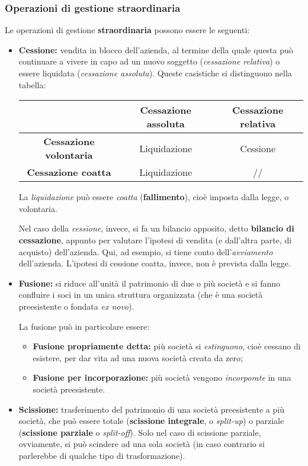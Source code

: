 \documentclass[a4paper,11pt]{article}
\begin{document}
\subsubsection{Operazioni di gestione straordinaria}
Le operazioni di gestione \textbf{straordinaria} possono essere le seguenti:
\begin{itemize}
	\item \textbf{Cessione:} vendita in blocco dell'azienda, al termine della quale questa può continuare a vivere in capo ad un nuovo soggetto (\textit{cessazione relativa}) o essere liquidata (\textit{cessazione assoluta}).
		Queste casistiche si distinguono nella tabella:
		\begin{table}[h!]
			\center {}
			\begin{tabular} { c | c | c }
				& \bfseries Cessazione assoluta & \bfseries Cessazione relativa \\
				\hline
				\bfseries Cessazione volontaria & Liquidazione & Cessione \\ 
				\bfseries Cessazione coatta & Liquidazione & // \\
			\end{tabular}
		\end{table}

		La \textit{liquidazione} può essere \textit{coatta} (\textbf{fallimento}), cioè imposta dalla legge, o volontaria.

		Nel caso della \textit{cessione}, invece, si fa un bilancio apposito, detto \textbf{bilancio di cessazione}, appunto per valutare l'ipotesi di vendita (e dall'altra parte, di acquisto) dell'azienda.
		Qui, ad esempio, si tiene conto dell'\textit{avviamento} dell'azienda.
		L'ipotesi di cessione coatta, invece, non è prevista dalla legge.

	\item \textbf{Fusione:} si riduce all'unità il patrimonio di due o più società e si fanno confluire i soci in un unica struttura organizzata (che è una società preesistente o fondata \textit{ex novo}).

		La fusione può in particolare essere:
		\begin{itemize}
			\item \textbf{Fusione propriamente detta:} più società si \textit{estinguono}, cioè cessano di esistere, per dar vita ad una nuova società creata da zero;
			\item \textbf{Fusione per incorporazione:} più società vengono \textit{incorporate} in una società preesistente.
		\end{itemize}
	\item \textbf{Scissione:} trasferimento del patrimonio di una società preesistente a più società, che può essere totale (\textbf{scissione integrale}, o \textit{split-up}) o parziale (\textbf{scissione parziale} o \textit{split-off}).
		Solo nel caso di scissione parziale, ovviamente, si può scindere ad una sola società (in caso contrario si parlerebbe di qualche tipo di trasformazione).


\end{itemize}
\end{document}
